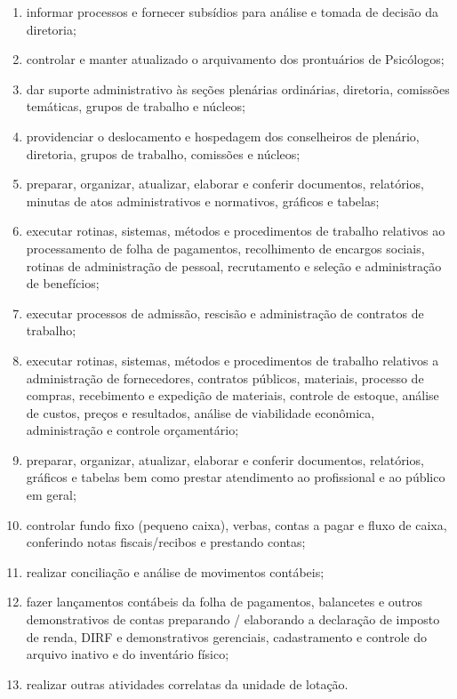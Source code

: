 \begin{enumerate}
  \item
        informar processos e fornecer subsídios para análise e tomada de
        decisão da diretoria;
  \item
        controlar e manter atualizado o arquivamento dos prontuários de
        Psicólogos;
  \item
        dar suporte administrativo às seções plenárias ordinárias, diretoria,
        comissões temáticas, grupos de trabalho e núcleos;
  \item
        providenciar o deslocamento e hospedagem dos conselheiros de plenário,
        diretoria, grupos de trabalho, comissões e núcleos;
  \item
        preparar, organizar, atualizar, elaborar e conferir documentos,
        relatórios, minutas de atos administrativos e normativos, gráficos e
        tabelas;
  \item
        executar rotinas, sistemas, métodos e procedimentos de trabalho
        relativos ao processamento de folha de pagamentos, recolhimento de
        encargos sociais, rotinas de administração de pessoal, recrutamento e
        seleção e administração de benefícios;
  \item
        executar processos de admissão, rescisão e administração de contratos
        de trabalho;
  \item
        executar rotinas, sistemas, métodos e procedimentos de trabalho
        relativos a administração de fornecedores, contratos públicos,
        materiais, processo de compras, recebimento e expedição de materiais,
        controle de estoque, análise de custos, preços e resultados, análise
        de viabilidade econômica, administração e controle orçamentário;
  \item
        preparar, organizar, atualizar, elaborar e conferir documentos,
        relatórios, gráficos e tabelas bem como prestar atendimento ao
        profissional e ao público em geral;
  \item
        controlar fundo fixo (pequeno caixa), verbas, contas a pagar e fluxo
        de caixa, conferindo notas fiscais/recibos e prestando contas;
  \item
        realizar conciliação e análise de movimentos contábeis;
  \item
        fazer lançamentos contábeis da folha de pagamentos, balancetes e
        outros demonstrativos de contas preparando / elaborando a declaração
        de imposto de renda, DIRF e demonstrativos gerenciais, cadastramento e
        controle do arquivo inativo e do inventário físico;
  \item
        realizar outras atividades correlatas da unidade de lotação.
\end{enumerate}
